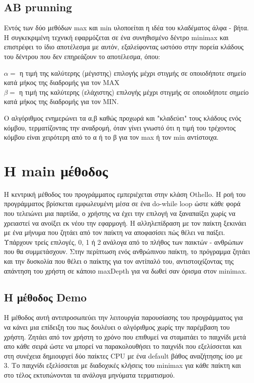 \documentclass[12pt]{article}
\begin{document}
\subsection*{ΑΒ prunning}
Εντός των δύο μεθόδων max και min υλοποείται η ιδέα του κλαδέματος άλφα - βήτα. Η συγκεκριμένη τεχνική εφαρμόζεται σε ένα συνηθισμένο δέντρο minimax και επιστρέφει το ίδιο αποτέλεσμα με αυτόν, εξαλείφοντας ωστόσο στην πορεία κλάδους του δέντρου που δεν επηρεάζουν το αποτέλεσμα, όπου: 
\begin{center}
$ α = $ η τιμή της καλύτερης (μέγιστης) επιλογής μέχρι στιγμής σε οποιοδήποτε σημείο κατά μήκος της διαδρομής για τον MAX \\ $β = $ η τιμή της καλύτερης (ελάχιστης) επιλογής μέχρι στιγμής σε οποιοδήποτε σημείο κατά μήκος της διαδρομής για τον MIN. 
\end{center}
Ο αλγόριθμος ενημερώνει τα α,β καθώς προχωρά και "κλαδεύει" τους κλάδους ενός κόμβου, τερματίζοντας την αναδρομή, όταν γίνει γνωστό ότι η τιμή του τρέχοντος κόμβου είναι χειρότερη από το α ή το β για τον max ή τον min αντίστοιχα. 

\section{Η main μέθοδος}
Η κεντρική μέθοδος του προγράμματος εμπεριέχεται στην κλάση Othello. Η ροή του προγράμματος βρίσκεται εμφωλευμένη μέσα σε ένα do-while loop ώστε κάθε φορά που τελειώνει μια παρτίδα, ο χρήστης να έχει την επιλογή να ξαναπαίξει χωρίς να χρειαστεί να ανοίξει εκ νέου την εφαρμογή. Η αλληλεπίδραση με τον παίκτη ξεκινάει με ένα μήνυμα που ζητάει από τον παίκτη να αποφασίσει πώς θέλει να παίξει. Υπάρχουν τρείς επιλογές, 0, 1 ή 2 ανάλογα από το πλήθος των παικτών - ανθρώπων που θα συμμετάσχουν.  Στην περίπτωση ενός ανθρώπινου παίκτη, το πρόγραμμα ζητάει και την δυσκολία που θέλει ο παίκτης για τον αντίπαλό του, αντιστοιχίζοντας της απάντηση του χρήστη σε κάποιο maxDepth για να δωθεί σαν όρισμα στον minimax. 
    \subsection{Η μέθοδος Demo}
    Η μέθοδος αυτή αντιπροσωπεύει την λειτουργία παρουσίασης του προγράμματος για να κάνει μια επίδειξη του πως δουλέυει ο αλγόριθμος χωρίς την παρέμβαση του χρήστη. Zητάει από τον χρήστη το χρόνο που επιθυμεί να σταματάει το παιχνίδι μετά απο κάθε σειρά ώστε να μπορεί να παρακολουθήσει το παιχνίδι που εξελίσσεται και στη συνέχεια δημιουργεί δύο παίκτες CPU με ένα default βάθος αναζήτησης ίσο με 3. Το παιχνίδι εξελίσσεται με διαδοχικές κλήσεις του minimax για κάθε παίκτη και στο τέλος εκτυπώνονται τα ανάλογα μηνύματα τερματισμού.
\end{document}
